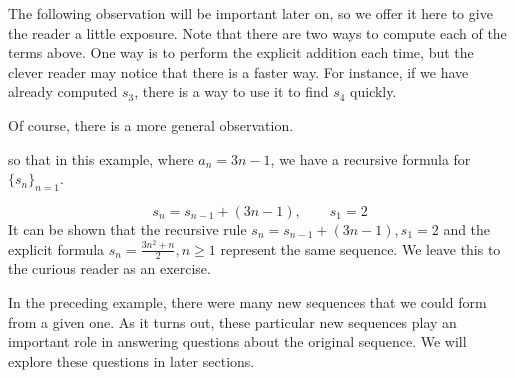 \documentclass{ximera}
\begin{document}
\begin{remark} 
The following observation will be important later on, so we offer it here to give the reader a little exposure.  Note that there are two ways to compute each of the terms above.  One way is to perform the explicit addition each time, but the clever reader may notice that there is a faster way.  For instance, if we have already computed $s_3$, there is a way to use it to find $s_4$ quickly.

\begin{image}
  \end{image}

Of course, there is a more general observation.

\begin{image}
  \end{image}
so that in this example, where $a_n = 3n-1$, we have a recursive formula for $\{s_n\}_{n=1}$.

\[
s_n = s_{n-1} + (3n-1), \qquad s_1 =2
\]  
It can be shown that the recursive rule $s_n = s_{n-1} + (3n-1), s_1
=2$ and the explicit formula $s_n = \frac{3n^2+n}{2} , n \geq 1$
represent the same sequence.  We leave this to the curious reader as
an exercise.    
\end{remark}

In the preceding example, there were many new sequences that we could form from a given one.  As it turns out, these particular new sequences play an important role in answering questions about the original sequence.  We will explore these questions in later sections.
\end{document}
